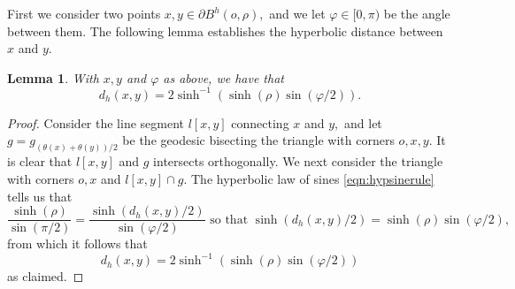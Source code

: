 \documentclass[a4paper,12pt]{article}
\newtheorem{lemma}[theorem]{Lemma}
\begin{document}
First we consider two points $x,y\in \partial B^h(o,\rho),$ and we let $\varphi\in[0,\pi)$ be the angle 
between them. The following lemma establishes the hyperbolic distance between $x$ and $y.$
\begin{lemma} \label{lemma:xydist}
With $x,y$ and $\varphi$ as above, we have that
\[
d_h(x,y)=2\sinh^{-1}\left(\sinh(\rho) \sin(\varphi/2)\right).
\] 
\end{lemma}
\begin{proof}
Consider the line segment $l[x,y]$ connecting $x$ and $y,$ 
and let $g=g_{(\theta(x)+\theta(y))/2}$ be the geodesic
bisecting the triangle with corners $o,x,y.$ It is clear that $l[x,y]$ and $g$ intersects orthogonally. 
We next consider the triangle with corners $o,x$ and $l[x,y]\cap g.$ The hyperbolic law of sines 
\eqref{eqn:hypsinerule}
tells us that 
\[
\frac{\sinh(\rho)}{\sin(\pi/2)}=\frac{\sinh(d_h(x,y)/2)}{\sin(\varphi/2)}
\textrm{ so that }
\sinh(d_h(x,y)/2)=\sinh(\rho) \sin(\varphi/2),
\]
from which it follows that 
\[
d_h(x,y)=2\sinh^{-1}\left(\sinh(\rho) \sin(\varphi/2)\right)
\]
as claimed.
\end{proof}
\end{document}
